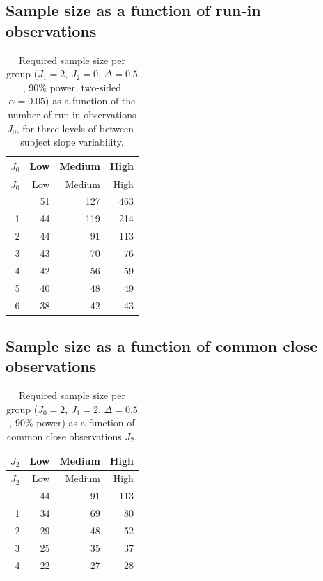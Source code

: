 \documentclass[
  11pt,
]{article}
\begin{document}
\subsection{Sample size as a function of run-in
observations}\label{sample-size-as-a-function-of-run-in-observations}

\begin{longtable}[]{@{}rrrr@{}}
\caption{Required sample size per group (\(J_1=2\), \(J_2=0\),
\(\Delta=0.5\), 90\% power, two-sided \(\alpha=0.05\)) as a function of
the number of run-in observations \(J_0\), for three levels of
between-subject slope variability.}\tabularnewline
\toprule\noalign{}
\(J_0\) & Low & Medium & High \\
\midrule\noalign{}
\endfirsthead
\toprule\noalign{}
\(J_0\) & Low & Medium & High \\
\midrule\noalign{}
\endhead
\bottomrule\noalign{}
\endlastfoot
0 & 51 & 127 & 463 \\
1 & 44 & 119 & 214 \\
2 & 44 & 91 & 113 \\
3 & 43 & 70 & 76 \\
4 & 42 & 56 & 59 \\
5 & 40 & 48 & 49 \\
6 & 38 & 42 & 43 \\
\end{longtable}

\subsection{Sample size as a function of common close
observations}\label{sample-size-as-a-function-of-common-close-observations}

\begin{longtable}[]{@{}rrrr@{}}
\caption{Required sample size per group (\(J_0=2\), \(J_1=2\),
\(\Delta=0.5\), 90\% power) as a function of common close observations
\(J_2\).}\tabularnewline
\toprule\noalign{}
\(J_2\) & Low & Medium & High \\
\midrule\noalign{}
\endfirsthead
\toprule\noalign{}
\(J_2\) & Low & Medium & High \\
\midrule\noalign{}
\endhead
\bottomrule\noalign{}
\endlastfoot
0 & 44 & 91 & 113 \\
1 & 34 & 69 & 80 \\
2 & 29 & 48 & 52 \\
3 & 25 & 35 & 37 \\
4 & 22 & 27 & 28 \\
\end{longtable}
\end{document}
